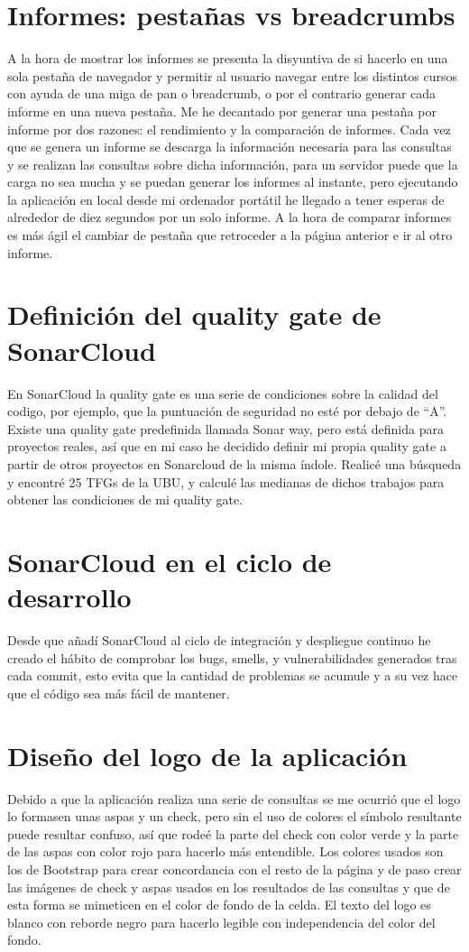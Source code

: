 \section{Informes: pestañas vs breadcrumbs}
A la hora de mostrar los informes se presenta la disyuntiva de si hacerlo en una sola pestaña de navegador y permitir al usuario navegar entre los distintos cursos con ayuda de una miga de pan o breadcrumb, o por el contrario generar cada informe en una nueva pestaña. Me he decantado por generar una pestaña por informe por dos razones: el rendimiento y la comparación de informes. Cada vez que se genera un informe se descarga la información necesaria para las consultas y se realizan las consultas sobre dicha información, para un servidor puede que la carga no sea mucha y se puedan generar los informes al instante, pero ejecutando la aplicación en local desde mi ordenador portátil he llegado a tener esperas de alrededor de diez segundos por un solo informe. A la hora de comparar informes es más ágil el cambiar de pestaña que retroceder a la página anterior e ir al otro informe.

\section{Definición del quality gate de SonarCloud}
En SonarCloud la quality gate es una serie de condiciones sobre la calidad del codigo, por ejemplo, que la puntuación de seguridad no esté por debajo de ``A''. Existe una quality gate predefinida llamada Sonar way, pero está definida para proyectos reales, así que en mi caso he decidido definir mi propia quality gate a partir de otros proyectos en Sonarcloud de la misma índole. Realicé una búsqueda y encontré 25 TFGs de la UBU, y calculé las medianas de dichos trabajos para obtener las condiciones de mi quality gate.

\section{SonarCloud en el ciclo de desarrollo}
Desde que añadí SonarCloud al ciclo de integración y despliegue continuo he creado el hábito de comprobar los bugs, smells, y vulnerabilidades generados tras cada commit, esto evita que la cantidad de problemas se acumule y a su vez hace que el código sea más fácil de mantener.

\section{Diseño del logo de la aplicación}
Debido a que la aplicación realiza una serie de consultas se me ocurrió que el logo lo formasen unas aspas y un check, pero sin el uso de colores el símbolo resultante puede resultar confuso, así que rodeé la parte del check con color verde y la parte de las aspas con color rojo para hacerlo más entendible.
Los colores usados son los de Bootstrap para crear concordancia con el resto de la página y de paso crear las imágenes de check y aspas usados en los resultados de las consultas y que de esta forma se mimeticen en el color de fondo de la celda. El texto del logo es blanco con reborde negro para hacerlo legible con independencia del color del fondo.

